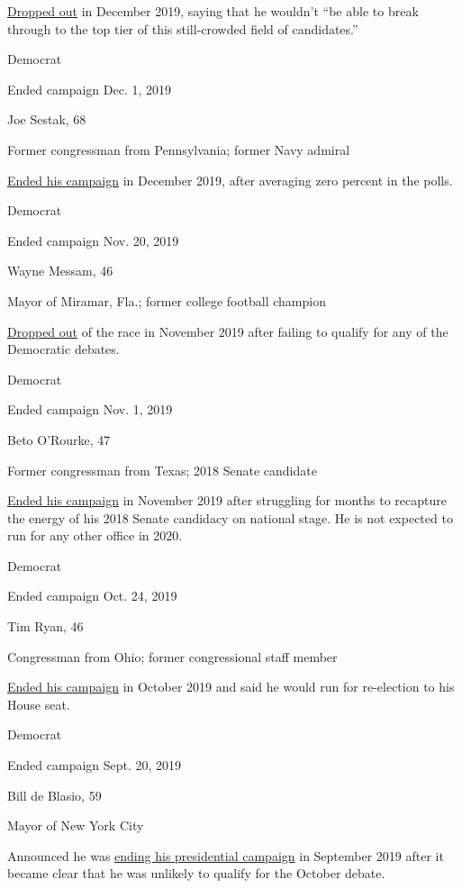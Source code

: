 \href{https://www.nytimes.com/2019/12/02/us/politics/steve-bullock-2020-drops-out.html}{Dropped
out} in December 2019, saying that he wouldn't ``be able to break
through to the top tier of this still-crowded field of candidates.''

Democrat

Ended campaign Dec. 1, 2019

Joe Sestak, 68

Former congressman from Pennsylvania; former Navy admiral

\href{https://www.nytimes.com/2019/12/01/us/politics/joe-sestak-ends-presidential-campaign.html}{Ended
his campaign} in December 2019, after averaging zero percent in the
polls.

Democrat

Ended campaign Nov. 20, 2019

Wayne Messam, 46

Mayor of Miramar, Fla.; former college football champion

\href{https://www.nytimes.com/2019/11/20/us/politics/wayne-messam-2020.html}{Dropped
out} of the race in November 2019 after failing to qualify for any of
the Democratic debates.

Democrat

Ended campaign Nov. 1, 2019

Beto O'Rourke, 47

Former congressman from Texas; 2018 Senate candidate

\href{https://www.nytimes.com/2019/11/01/us/politics/beto-orourke-drops-out.html}{Ended
his campaign} in November 2019 after struggling for months to recapture
the energy of his 2018 Senate candidacy on national stage. He is not
expected to run for any other office in 2020.

Democrat

Ended campaign Oct. 24, 2019

Tim Ryan, 46

Congressman from Ohio; former congressional staff member

\href{https://www.nytimes.com/2019/10/24/us/politics/tim-ryan-drops-out.html}{Ended
his campaign} in October 2019 and said he would run for re-election to
his House seat.

Democrat

Ended campaign Sept. 20, 2019

Bill de Blasio, 59

Mayor of New York City

Announced he was
\href{https://www.nytimes.com/2019/09/20/nyregion/de-blasio-2020-drops-out.html}{ending
his presidential campaign} in September 2019 after it became clear that
he was unlikely to qualify for the October debate.

